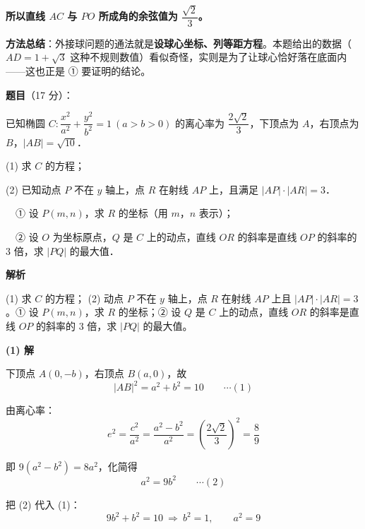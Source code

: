 \begin{answer}
\textbf{所以直线 $AC$ 与 $PO$ 所成角的余弦值为 $\dfrac{\sqrt2}{3}$。}

\begin{gktip}
\textbf{方法总结}：外接球问题的通法就是\textbf{设球心坐标、列等距方程}。本题给出的数据（$AD=1+\sqrt3$ 这种不规则数值）看似奇怪，实则是为了让球心恰好落在底面内——这也正是 ① 要证明的结论。
\end{gktip}



\par\medskip

\end{answer}
\begin{answer}

\textbf{题目}（17 分）：

已知椭圆 $C:\dfrac{x^2}{a^2}+\dfrac{y^2}{b^2}=1\ (a>b>0)$ 的离心率为 $\dfrac{2\sqrt2}{3}$，下顶点为 $A$，右顶点为 $B$，$|AB|=\sqrt{10}$．

  (1) 求 $C$ 的方程；

  (2) 已知动点 $P$ 不在 $y$ 轴上，点 $R$ 在射线 $AP$ 上，且满足 $|AP|\cdot|AR|=3$．

  　① 设 $P(m,n)$，求 $R$ 的坐标（用 $m$，$n$ 表示）；

  　② 设 $O$ 为坐标原点，$Q$ 是 $C$ 上的动点，直线 $OR$ 的斜率是直线 $OP$ 的斜率的 $3$ 倍，求 $|PQ|$ 的最大值．

\textbf{解析}

  (1) 求 $C$ 的方程；
  (2) 动点 $P$ 不在 $y$ 轴上，点 $R$ 在射线 $AP$ 上且 $|AP|\cdot|AR|=3$。① 设 $P(m,n)$，求 $R$ 的坐标；② 设 $Q$ 是 $C$ 上的动点，直线 $OR$ 的斜率是直线 $OP$ 的斜率的 $3$ 倍，求 $|PQ|$ 的最大值。

\par\medskip

\textbf{(1) 解}

下顶点 $A(0,-b)$，右顶点 $B(a,0)$，故
\nopagebreak[4]
\[|AB|^2=a^2+b^2=10\qquad\cdots(1)\]

由离心率：
\nopagebreak[4]
\[e^2=\frac{c^2}{a^2}=\frac{a^2-b^2}{a^2}=\left(\frac{2\sqrt2}{3}\right)^2=\frac89\]

即 $9\left(a^2-b^2\right)=8a^2$，化简得
\nopagebreak[4]
\[a^2=9b^2\qquad\cdots(2)\]

把 (2) 代入 (1)：
\nopagebreak[4]
\[9b^2+b^2=10\ \Longrightarrow\ b^2=1,\qquad a^2=9\]


\end{answer}
